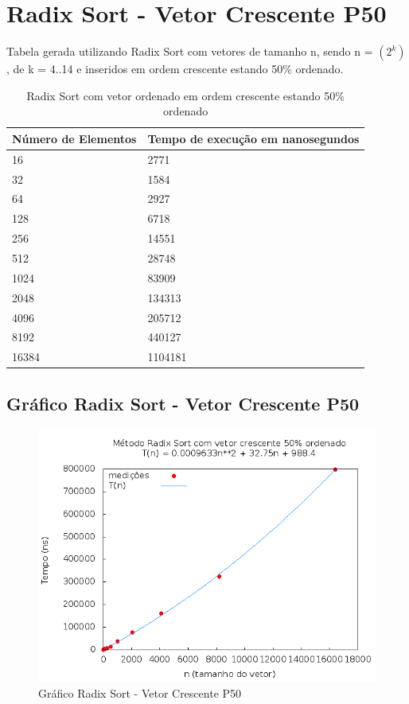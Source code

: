 \documentclass[12pt,a4paper,twoside]{report}
\begin{document}
\section{Radix Sort - Vetor Crescente P50}
Tabela gerada utilizando Radix Sort com vetores de tamanho n, sendo n = $(2^k)$, de k = 4..14 e inseridos em ordem crescente estando 50\% ordenado.
\begin{table}[H]
\centering
\caption{Radix Sort com vetor ordenado em ordem crescente estando 50\% ordenado}
\label{my-label}
\begin{tabular}{|l|l|}
\hline
\multicolumn{1}{|c|}{\textbf{Número de Elementos}} & \multicolumn{1}{c|}{\textbf{Tempo de execução em nanosegundos}} \\ \hline
16 & 2771 \\ \hline
32 & 1584 \\ \hline
64 & 2927 \\ \hline
128 & 6718 \\ \hline
256 & 14551 \\ \hline
512 & 28748 \\ \hline
1024 & 83909 \\ \hline
2048 & 134313 \\ \hline
4096 & 205712 \\ \hline
8192 & 440127 \\ \hline
16384 & 1104181 \\ \hline
\end{tabular}
\end{table}

\subsection{Gráfico Radix Sort - Vetor Crescente P50}
\begin{figure}[H]
    \centering
    \includegraphics[width=0.7\linewidth]{graficos/RadixSort/vIntCrescenteP50/vIntCrescenteP50.png}
  \caption{Gráfico Radix Sort - Vetor Crescente P50}
\end{figure}
\end{document}
